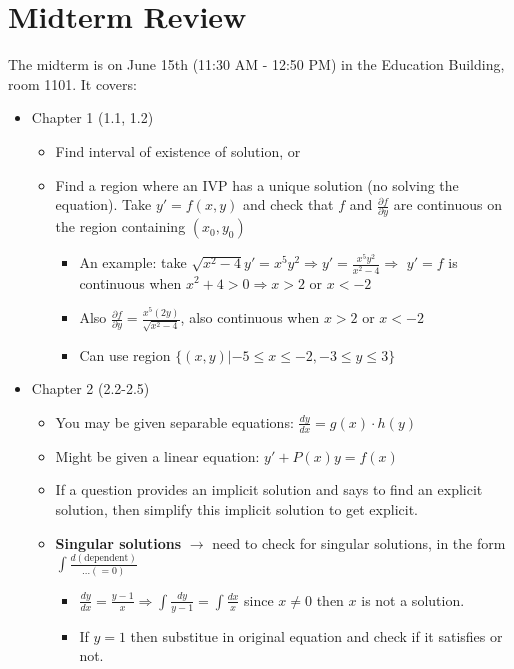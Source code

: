\documentclass{article}
\newcommand{\p}{\partial}
\begin{document}
\section{Midterm Review}
The midterm is on June 15th (11:30 AM - 12:50 PM) in the Education Building, room 1101.
It covers:\begin{itemize}
    \itemsep 0em
    \item Chapter 1 (1.1, 1.2) \begin{itemize}
        \item Find interval of existence of solution, or
        \item Find a region where an IVP has a unique solution (no solving the equation). Take $y'=f(x,y)$ and check that $f$ and $\frac{\p f}{\p y}$ are continuous on the region containing $(x_0,y_0)$
        \begin{itemize}
            \item An example: take $\sqrt{x^2-4}y'=x^5y^2\Rightarrow y'=\frac{x^5y^2}{x^2-4}\Rightarrow$ $y'=f$ is continuous when $x^2+4>0\Rightarrow x>2$ or $x<-2$
            \item Also $\frac{\p f}{\p y}=\frac{x^5(2y)}{\sqrt{x^2-4}}$, also continuous when $x>2$ or $x<-2$
            \item Can use region $\{(x,y)|-5\leq x\leq-2, -3\leq y\leq 3\}$
        \end{itemize}
    \end{itemize}
    \item Chapter 2 (2.2-2.5) \begin{itemize}
        \item You may be given separable equations: $\frac{dy}{dx}=g(x)\cdot h(y)$
        \item Might be given a linear equation: $y'+P(x)y=f(x)$
        \item If a question provides an implicit solution and says to find an explicit solution, then simplify this implicit solution to get explicit.
        \item \textbf{Singular solutions} $\to$ need to check for singular solutions, in the form $\int\frac{d(\text{dependent})}{\dots(=0)}$ \begin{itemize}
            \item $\frac{dy}{dx}=\frac{y-1}{x}\Rightarrow \int\frac{dy}{y-1}=\int\frac{dx}{x}$ since $x\neq0$ then $x$ is not a solution.
            \item If $y=1$ then substitue in original equation and check if it satisfies or not.
        \end{itemize}

\end{itemize}
\end{itemize}
\end{document}
